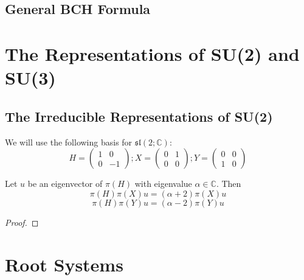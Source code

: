 \subsection{General BCH Formula}


\section{The Representations of SU(2) and SU(3)}
\subsection{The Irreducible Representations of SU(2)}
We will use the following basis for $\mathfrak{sl}(2;\mathbb{C})$:
\[H=\begin{pmatrix}
    1 & 0 \\
    0 & -1
   \end{pmatrix};X=\begin{pmatrix}
    0 & 1\\
    0 & 0
   \end{pmatrix};Y=\begin{pmatrix}
    0 & 0\\
     1 & 0
   \end{pmatrix}\]

\begin{lemma}
    Let $u$ be an eigenvector of $\pi(H)$ with eigenvalue $\alpha\in\mathbb{C}$. Then 
    \[\pi(H)\pi(X)u=(\alpha+2)\pi(X)u\] 
    \[\pi(H)\pi(Y)u=(\alpha-2)\pi(Y)u\]
\end{lemma}
\begin{proof}
    
\end{proof}

\section{Root Systems}



